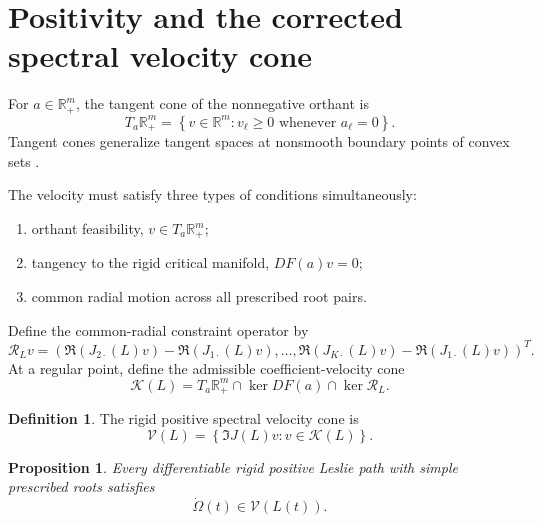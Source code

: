 \documentclass[11pt]{amsart}
\numberwithin{equation}{section}
\theoremstyle{plain}
\newtheorem{proposition}[theorem]{Proposition}
\theoremstyle{definition}
\newtheorem{definition}[theorem]{Definition}
\theoremstyle{remark}
\begin{document}
\section{Positivity and the corrected spectral velocity cone}
\label{sec:velocity_cone}

For $a\in\mathbb R_+^m$, the tangent cone of the nonnegative orthant is
\begin{equation}
T_a\mathbb R_+^m
=
\left\{
v\in\mathbb R^m:
 v_\ell\geq0\text{ whenever }a_\ell=0
\right\}.
\label{eq:orthant_tangent_cone}
\end{equation}
Tangent cones generalize tangent spaces at nonsmooth boundary points of convex sets \cite{Wright2019}.

The velocity must satisfy three types of conditions simultaneously:
\begin{enumerate}
\item orthant feasibility, $v\in T_a\mathbb R_+^m$;
\item tangency to the rigid critical manifold, $DF(a)v=0$;
\item common radial motion across all prescribed root pairs.
\end{enumerate}

Define the common-radial constraint operator by
\begin{equation}
\mathcal R_Lv
=
\left(
\Re(J_{2\cdot}(L)v)-\Re(J_{1\cdot}(L)v),
\ldots,
\Re(J_{K\cdot}(L)v)-\Re(J_{1\cdot}(L)v)
\right)^T.
\label{eq:common_radial_operator}
\end{equation}
At a regular point, define the admissible coefficient-velocity cone
\begin{equation}
\mathcal K(L)
=
T_a\mathbb R_+^m
\cap\ker DF(a)
\cap\ker\mathcal R_L.
\label{eq:admissible_coefficient_cone}
\end{equation}

\begin{definition}
\label{def:spectral_velocity_cone}
The rigid positive spectral velocity cone is
\begin{equation}
\mathcal V(L)
=
\left\{
\Im J(L)v:
 v\in\mathcal K(L)
\right\}.
\label{eq:spectral_velocity_cone}
\end{equation}
\end{definition}

\begin{proposition}
\label{prop:necessary_velocity_condition}
Every differentiable rigid positive Leslie path with simple prescribed roots satisfies
\begin{equation}
\dot\Omega(t)\in\mathcal V(L(t)).
\label{eq:velocity_necessary_condition}
\end{equation}
\end{proposition}
\end{document}
